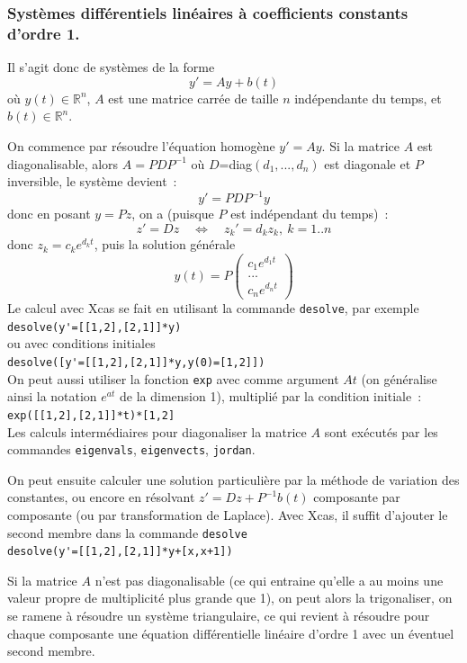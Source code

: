\documentclass[a4paper,11pt]{article}
\newcommand{\R}{{\mathbb{R}}}
\begin{document}
\subsubsection{Syst\`emes diff\'erentiels lin\'eaires \`a coefficients
constants d'ordre 1.}
Il s'agit donc de syst\`emes de la forme
$$ y'=Ay+b(t)$$
o\`u $y(t)\in \R^n$, $A$ est une matrice carr\'ee de taille $n$ 
ind\'ependante du temps, et $b(t) \in \R^n$.

On commence par r\'esoudre l'\'equation homog\`ene $y'=Ay$.
Si la matrice $A$ est diagonalisable, alors $A=PDP^{-1}$ o\`u
$D$=diag$(d_1,...,d_n)$ est diagonale et $P$ inversible, le syst\`eme devient~:
$$ y'=PDP^{-1} y$$
donc en posant $y=Pz$, on a (puisque $P$ est ind\'ependant du temps)~:
$$ z'=Dz \quad \Leftrightarrow \quad z_k'=d_kz_k, \ k=1..n$$
donc $z_k=c_k e^{d_kt}$, puis la solution g\'en\'erale
$$y(t)=P\left( \begin{array}{c} c_1 e^{d_1t} \\ ... \\c_n e^{d_nt}
\end{array} \right)$$
Le calcul avec Xcas se fait en utilisant la commande \verb|desolve|,
par exemple\\
\verb|desolve(y'=[[1,2],[2,1]]*y)|\\
ou avec conditions initiales\\
\verb|desolve([y'=[[1,2],[2,1]]*y,y(0)=[1,2]])|\\
On peut aussi utiliser la fonction \verb|exp|
avec comme argument $At$ (on g\'en\'eralise ainsi 
la notation $e^{at}$ 
de la dimension 1), multipli\'e par la condition initiale~:\\
\verb|exp([[1,2],[2,1]]*t)*[1,2]|\\
Les calculs interm\'ediaires pour diagonaliser la matrice $A$ sont
ex\'ecut\'es par les commandes \verb|eigenvals|, \verb|eigenvects|,
\verb|jordan|.

On peut ensuite calculer une solution particuli\`ere par la m\'ethode
de variation des constantes, ou encore en r\'esolvant 
$z'=Dz+P^{-1}b(t)$ composante par composante (ou par transformation
de Laplace). Avec Xcas,
il suffit d'ajouter le second membre dans la commande \verb|desolve|\\
\verb|desolve(y'=[[1,2],[2,1]]*y+[x,x+1])|

Si la matrice $A$ n'est pas diagonalisable (ce qui entraine
qu'elle a au moins une valeur propre de
multiplicit\'e plus grande que 1), on peut alors
la trigonaliser, on se ramene \`a r\'esoudre un syst\`eme
triangulaire, ce qui revient \`a r\'esoudre pour chaque
composante une \'equation
diff\'erentielle lin\'eaire d'ordre 1 avec un \'eventuel 
second membre. 
\end{document}
